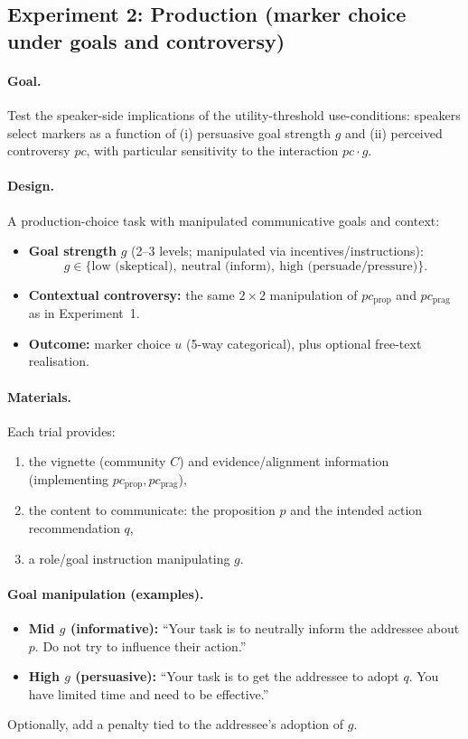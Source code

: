 \documentclass[12pt]{article}
\begin{document}
\subsection{Experiment 2: Production (marker choice under goals and controversy)}

\paragraph{Goal.}
Test the speaker-side implications of the utility-threshold use-conditions: speakers select markers as a function of (i) persuasive goal strength $g$ and (ii) perceived controversy $pc$, with particular sensitivity to the interaction $pc \cdot g$.

\paragraph{Design.}
A production-choice task with manipulated communicative goals and context:
\begin{itemize}
\item \textbf{Goal strength} $g$ (2--3 levels; manipulated via incentives/instructions):
\[
g \in \{\text{low (skeptical)},\ \text{neutral (inform)},\ \text{high (persuade/pressure)}\}.
\]
\item \textbf{Contextual controversy:} the same $2\times 2$ manipulation of $pc_{\text{prop}}$ and $pc_{\text{prag}}$ as in Experiment~1.
\item \textbf{Outcome:} marker choice $u$ (5-way categorical), plus optional free-text realisation.
\end{itemize}

\paragraph{Materials.}
Each trial provides:
\begin{enumerate}
\item the vignette (community $C$) and evidence/alignment information (implementing $pc_{\text{prop}}, pc_{\text{prag}}$),
\item the content to communicate: the proposition $p$ and the intended action recommendation $q$,
\item a role/goal instruction manipulating $g$.
\end{enumerate}

\paragraph{Goal manipulation (examples).}
\begin{itemize}
\item \textbf{Mid $g$ (informative):} ``Your task is to neutrally inform the addressee about $p$. Do not try to influence their action.''
\item \textbf{High $g$ (persuasive):} ``Your task is to get the addressee to adopt $q$. You have limited time and need to be effective.''
\end{itemize}
Optionally, add a penalty tied to the addressee's adoption of $g$.
\end{document}
